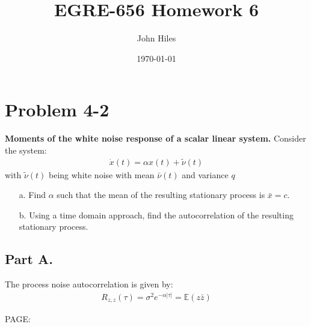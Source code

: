 \documentclass{article}
\title{EGRE-656 Homework 6}
\author{John Hiles}
\date\today
\begin{document}
\maketitle %

\section*{Problem 4-2}
\textbf{Moments of the white noise response of a scalar linear system.}
Consider the system:
\begin{align*}
\dot{x}(t) = \alpha x(t) + \tilde{\nu}(t)
\end{align*}
with $\tilde{\nu}(t)$ being white noise with mean $\bar{\nu}(t)$ and variance $q$

\begin{enumerate}
\item[a.] Find $\alpha$ such that the mean of the resulting stationary process is $\bar{x}=c$.
\item[b.] Using a time domain approach, find the autocorrelation of the resulting stationary process.
\end{enumerate}

\subsection*{Part A.}
The process noise autocorrelation is given by:
\begin{align*}
R_{z,z}(\tau) = \sigma^2 e^{-\alpha |\tau|} = \mathbb{E}(z \bar{z})
\end{align*}

PAGE:
\end{document}
